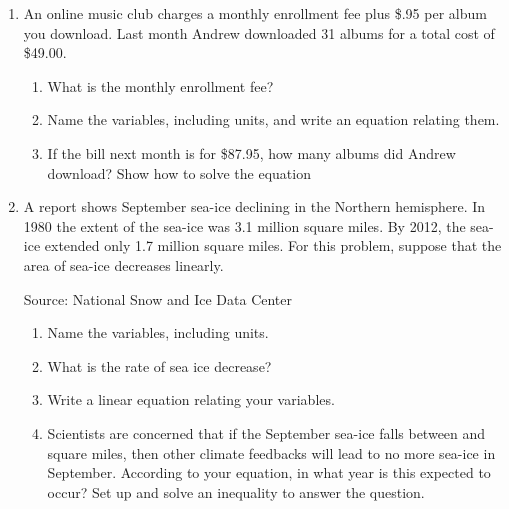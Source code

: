 \begin{enumerate}
\newpage

\item An online music club charges a monthly enrollment fee plus \$.95 per album you download.  Last month Andrew downloaded 31 albums for a total cost of \$49.00.  
\begin{enumerate}
\item What is the monthly enrollment fee?  
\vfill
\item Name the variables, including units, and write an equation relating them. 
\vfill
\item If the bill next month is for \$87.95, how many albums did Andrew download? Show how to solve the equation
\vfill
\end{enumerate} 

\newpage

\item A report  shows September sea-ice declining in the Northern hemisphere. In 1980 the extent of the sea-ice was 3.1 million square miles.  By 2012, the sea-ice extended only 1.7 million square miles.  For this problem, suppose that the area of sea-ice decreases linearly. 
\hfill \begin{footnotesize} Source: National Snow and Ice Data Center \end{footnotesize}
\begin{enumerate}
\item Name the variables, including units. 
\vfill
\item What is the rate of sea ice decrease? 
\vfill
\item Write a linear equation relating your variables. 
\vfill
\item Scientists are concerned that if the September sea-ice falls between  and  square miles, then other climate feedbacks will lead to no more sea-ice in September.  According to your equation, in what year is this expected to occur?  Set up and solve an inequality to answer the question. 
\vfill
\end{enumerate} 

\newpage


\end{enumerate}
